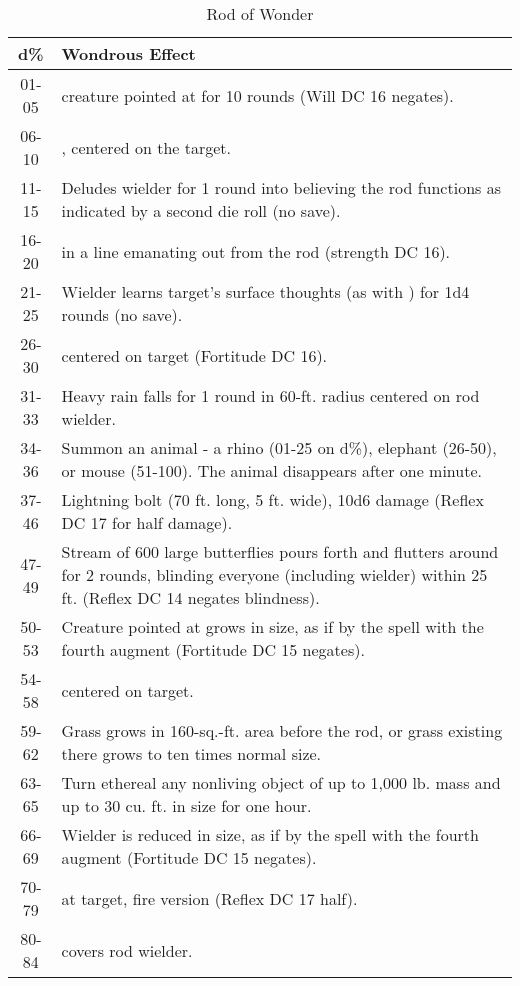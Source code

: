 \begin{table*}
\caption{Rod of Wonder}
\label{tab:RodOfWonder}
\centering
\begin{tabular}{|c|p{}|}
\hline
\textbf{d\%}&\textbf{Wondrous Effect}\\
\hline
01-05&\nameref{Spell:Slow} creature pointed at for 10 rounds (Will DC 16 negates).\\
06-10&\nameref{Spell:FaerieFire}, centered on the target.\\
11-15&Deludes wielder for 1 round into believing the rod functions as indicated by a second die roll (no save).\\
16-20&\nameref{Spell:GustOfWind} in a line emanating out from the rod (strength DC 16).\\
21-25&Wielder learns target's surface thoughts (as with \nameref{Spell:ReadThoughts}) for 1d4 rounds (no save).\\
26-30&\nameref{Spell:NoxiousVapors} centered on target (Fortitude DC 16).\\
31-33&Heavy rain falls for 1 round in 60-ft. radius centered on rod wielder.\\
34-36&Summon an animal - a rhino (01-25 on d\%), elephant (26-50), or mouse (51-100). The animal disappears after one minute.\\
37-46&Lightning bolt (70 ft. long, 5 ft. wide), 10d6 damage (Reflex DC 17 for half damage).\\
47-49&Stream of 600 large butterflies pours forth and flutters around for 2 rounds, blinding everyone (including wielder) within 25 ft. (Reflex DC 14 negates blindness).\\
50-53&Creature pointed at grows in size, as if by the \nameref{Spell:AlterSize} spell with the fourth augment (Fortitude DC 15 negates).\\
54-58&\nameref{Spell:Darkness} centered on target.\\
59-62&Grass grows in 160-sq.-ft. area before the rod, or grass existing there grows to ten times normal size.\\
63-65&Turn ethereal any nonliving object of up to 1,000 lb. mass and up to 30 cu. ft. in size for one hour.\\
66-69&Wielder is reduced in size, as if by the \nameref{Spell:AlterSize} spell with the fourth augment (Fortitude DC 15 negates).\\
70-79&\nameref{Spell:Fireball} at target, fire version (Reflex DC 17 half).\\
80-84&\nameref{Spell:Invisibility} covers rod wielder.\\

\end{tabular}
\end{table*}

